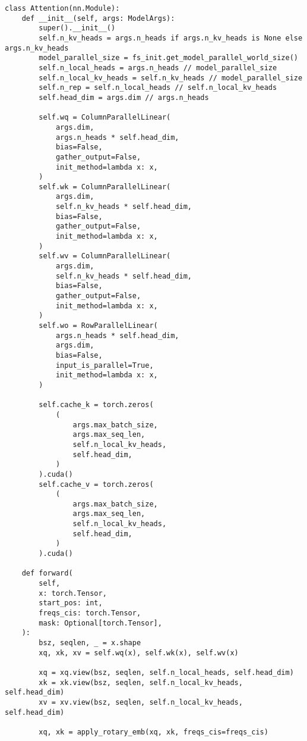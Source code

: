 \begin{lstlisting}
class Attention(nn.Module):
    def __init__(self, args: ModelArgs):
        super().__init__()
        self.n_kv_heads = args.n_heads if args.n_kv_heads is None else args.n_kv_heads
        model_parallel_size = fs_init.get_model_parallel_world_size()
        self.n_local_heads = args.n_heads // model_parallel_size
        self.n_local_kv_heads = self.n_kv_heads // model_parallel_size
        self.n_rep = self.n_local_heads // self.n_local_kv_heads
        self.head_dim = args.dim // args.n_heads

        self.wq = ColumnParallelLinear(
            args.dim,
            args.n_heads * self.head_dim,
            bias=False,
            gather_output=False,
            init_method=lambda x: x,
        )
        self.wk = ColumnParallelLinear(
            args.dim,
            self.n_kv_heads * self.head_dim,
            bias=False,
            gather_output=False,
            init_method=lambda x: x,
        )
        self.wv = ColumnParallelLinear(
            args.dim,
            self.n_kv_heads * self.head_dim,
            bias=False,
            gather_output=False,
            init_method=lambda x: x,
        )
        self.wo = RowParallelLinear(
            args.n_heads * self.head_dim,
            args.dim,
            bias=False,
            input_is_parallel=True,
            init_method=lambda x: x,
        )

        self.cache_k = torch.zeros(
            (
                args.max_batch_size,
                args.max_seq_len,
                self.n_local_kv_heads,
                self.head_dim,
            )
        ).cuda()
        self.cache_v = torch.zeros(
            (
                args.max_batch_size,
                args.max_seq_len,
                self.n_local_kv_heads,
                self.head_dim,
            )
        ).cuda()

    def forward(
        self,
        x: torch.Tensor,
        start_pos: int,
        freqs_cis: torch.Tensor,
        mask: Optional[torch.Tensor],
    ):
        bsz, seqlen, _ = x.shape
        xq, xk, xv = self.wq(x), self.wk(x), self.wv(x)

        xq = xq.view(bsz, seqlen, self.n_local_heads, self.head_dim)
        xk = xk.view(bsz, seqlen, self.n_local_kv_heads, self.head_dim)
        xv = xv.view(bsz, seqlen, self.n_local_kv_heads, self.head_dim)

        xq, xk = apply_rotary_emb(xq, xk, freqs_cis=freqs_cis)


\end{lstlisting}
